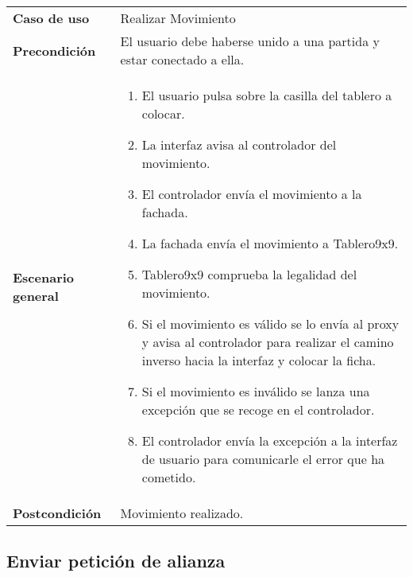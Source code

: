 {\footnotesize
\begin{tabularx}{0.95\textwidth}{p{}|X}

\textbf{Caso de uso} & Realizar Movimiento \\

\textbf{Precondición} & El usuario debe haberse unido a una partida y estar
conectado a ella. \\

\textbf{Escenario general} & \begin{enumerate}
\item El usuario pulsa sobre la casilla del tablero a colocar.
\item La interfaz avisa al controlador del movimiento.
\item El controlador envía el movimiento a la fachada.
\item La fachada envía el movimiento a Tablero9x9.
\item Tablero9x9 comprueba la legalidad del movimiento.
\item Si el movimiento es válido se lo envía al proxy y avisa al controlador para realizar el camino inverso hacia la interfaz y colocar la ficha.
\item Si el movimiento es inválido se lanza una excepción que se recoge en el controlador.
\item El controlador envía la excepción a la interfaz de usuario para comunicarle el error que ha cometido.
\end{enumerate} \\
\textbf{Postcondición} & Movimiento realizado. \\
\end{tabularx}
}

\subsection{Enviar petición de alianza}

